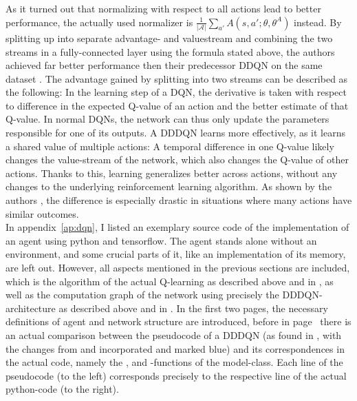 As it turned out that normalizing with respect to all actions lead to better performance, the actually used normalizer is $\frac{1}{|\mathcal{A}|} \sum_{a'} A(s, a'; \theta, \theta^A)$ instead. By splitting up into separate advantage- and valuestream and combining the two streams in a fully-connected layer using the formula stated above, the authors achieved far better performance then their predecessor DDQN on the same dataset \cite{wang_dueling_2015}. The advantage gained by splitting into two streams can be described as the following: In the learning step of a DQN, the derivative is taken with respect to difference in the expected Q-value of an action and the better estimate of that Q-value. In normal DQNs, the network can thus only update the parameters responsible for one of its outputs. A DDDQN learns more effectively, as it learns a shared value of multiple actions: A temporal difference in one Q-value likely changes the value-stream of the network, which also changes the Q-value of other actions. Thanks to this, learning generalizes better across actions, without any changes to the underlying reinforcement learning algorithm. As shown by the authors \cite{wang_dueling_2015}, the difference is especially drastic in situations where many actions have similar outcomes.\\


In appendix~\ref{ap:dqn}, I listed an exemplary source code of the implementation of an agent using python and tensorflow. The agent stands alone without an environment, and some crucial parts of it, like an implementation of its memory, are left out. However, all aspects mentioned in the previous sections are included, which is the algorithm of the actual Q-learning as described above and in \cite{van_hasselt_deep_2015}, as well as the computation graph of the network using precisely the DDDQN-architecture as described above and in \cite{wang_dueling_2015}. In the first two pages, the necessary definitions of agent and network structure are introduced, before in page~\pageref{ap:dqn_comparison} there is an actual comparison between the pseudocode of a DDDQN (as found in \cite{mnih_human-level_2015}, with the changes from \cite{van_hasselt_deep_2015} and \cite{lillicrap_continuous_2015} incorporated and marked blue) and its correspondences in the actual code, namely the ,  and -functions of the model-class. Each line of the pseudocode (to the left) corresponds precisely to the respective line of the actual python-code (to the right).



